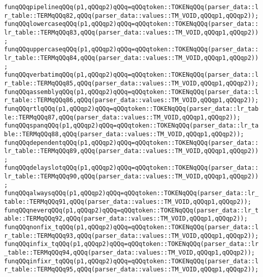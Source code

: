 \verb|funqQQqpipelineqQQq(p1,qQQqp2)qQQq=qQQqtoken::TOKENqQQq(parser_data::lr_table::TERMqQQq82,qQQq(parser_data::values::TM_VOID,qQQqp1,qQQqp2));|\newline
\verb|funqQQqlowercaseqQQq(p1,qQQqp2)qQQq=qQQqtoken::TOKENqQQq(parser_data::lr_table::TERMqQQq83,qQQq(parser_data::values::TM_VOID,qQQqp1,qQQqp2));|\newline
\verb|funqQQquppercaseqQQq(p1,qQQqp2)qQQq=qQQqtoken::TOKENqQQq(parser_data::lr_table::TERMqQQq84,qQQq(parser_data::values::TM_VOID,qQQqp1,qQQqp2));|\newline
\verb|funqQQqverbatimqQQq(p1,qQQqp2)qQQq=qQQqtoken::TOKENqQQq(parser_data::lr_table::TERMqQQq85,qQQq(parser_data::values::TM_VOID,qQQqp1,qQQqp2));|\newline
\verb|funqQQqassemblyqQQq(p1,qQQqp2)qQQq=qQQqtoken::TOKENqQQq(parser_data::lr_table::TERMqQQq86,qQQq(parser_data::values::TM_VOID,qQQqp1,qQQqp2));|\newline
\verb|funqQQqrtlqQQq(p1,qQQqp2)qQQq=qQQqtoken::TOKENqQQq(parser_data::lr_table::TERMqQQq87,qQQq(parser_data::values::TM_VOID,qQQqp1,qQQqp2));|\newline
\verb|funqQQqspanqQQq(p1,qQQqp2)qQQq=qQQqtoken::TOKENqQQq(parser_data::lr_table::TERMqQQq88,qQQq(parser_data::values::TM_VOID,qQQqp1,qQQqp2));|\newline
\verb|funqQQqdependentqQQq(p1,qQQqp2)qQQq=qQQqtoken::TOKENqQQq(parser_data::lr_table::TERMqQQq89,qQQq(parser_data::values::TM_VOID,qQQqp1,qQQqp2));|\newline
\verb|funqQQqdelayslotqQQq(p1,qQQqp2)qQQq=qQQqtoken::TOKENqQQq(parser_data::lr_table::TERMqQQq90,qQQq(parser_data::values::TM_VOID,qQQqp1,qQQqp2));|\newline
\verb|funqQQqalwaysqQQq(p1,qQQqp2)qQQq=qQQqtoken::TOKENqQQq(parser_data::lr_table::TERMqQQq91,qQQq(parser_data::values::TM_VOID,qQQqp1,qQQqp2));|\newline
\verb|funqQQqneverqQQq(p1,qQQqp2)qQQq=qQQqtoken::TOKENqQQq(parser_data::lr_table::TERMqQQq92,qQQq(parser_data::values::TM_VOID,qQQqp1,qQQqp2));|\newline
\verb|funqQQqnonfix_tqQQq(p1,qQQqp2)qQQq=qQQqtoken::TOKENqQQq(parser_data::lr_table::TERMqQQq93,qQQq(parser_data::values::TM_VOID,qQQqp1,qQQqp2));|\newline
\verb|funqQQqinfix_tqQQq(p1,qQQqp2)qQQq=qQQqtoken::TOKENqQQq(parser_data::lr_table::TERMqQQq94,qQQq(parser_data::values::TM_VOID,qQQqp1,qQQqp2));|\newline
\verb|funqQQqinfixr_tqQQq(p1,qQQqp2)qQQq=qQQqtoken::TOKENqQQq(parser_data::lr_table::TERMqQQq95,qQQq(parser_data::values::TM_VOID,qQQqp1,qQQqp2));|\newline

